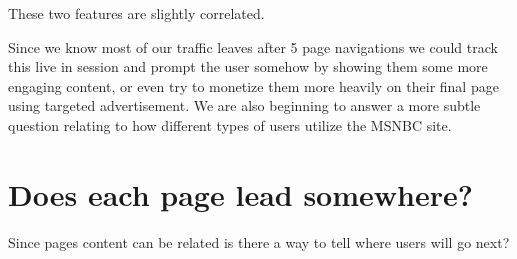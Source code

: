 \documentclass{article}
\begin{document}
These two features are slightly correlated.

Since we know most of our traffic leaves after 5 page navigations we could track this live in session and prompt the user somehow by showing them some more engaging content, or even try to monetize them more heavily on their final page using targeted advertisement. We are also beginning to answer a more subtle question relating to how different types of users utilize the MSNBC site.

\section{Does each page lead somewhere?}
Since pages content can be related is there a way to tell where users will go next?
\end{document}
